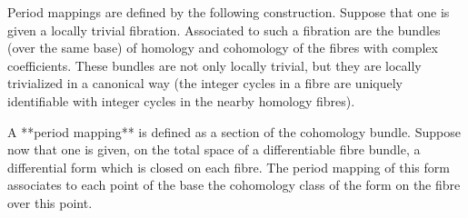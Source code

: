 Period mappings are defined by the following construction. Suppose that one is given a locally trivial fibration. Associated to such a fibration are the bundles (over the same base) of homology and cohomology of the fibres with complex coefficients. These bundles are not only locally trivial, but they are locally trivialized in a canonical way (the integer cycles in a fibre are uniquely identifiable with integer cycles in the nearby homology fibres).

A **period mapping** is defined as a section of the cohomology bundle. Suppose now that one is given, on the total space of a differentiable fibre bundle, a differential form which is closed on each fibre. The period mapping of this form associates to each point of the base the cohomology class of the form on the fibre over this point.
